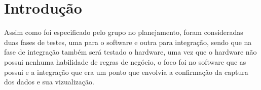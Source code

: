 \section{Introdução}
\label{Sec:6-introducao}

Assim como foi especificado pelo grupo no planejamento, foram consideradas duas fases de testes, uma para o software e outra para integração, sendo que na fase de integração também será testado o hardware, uma vez que o hardware não possui nenhuma habilidade de regras de negócio, o foco foi no software que as possui e a integração que era um ponto que envolvia a confirmação da captura dos dados e sua vizualização.
